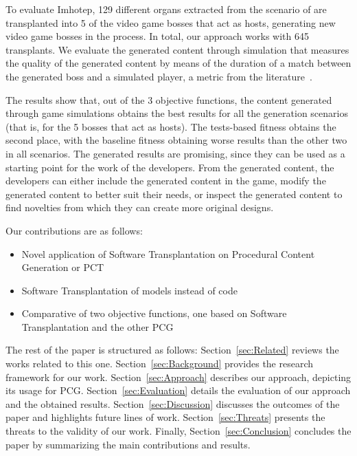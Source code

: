 To evaluate Imhotep, 129 different organs extracted from the scenario of \CaseStudy are transplanted into 5 of the video game bosses that act as hosts, generating new video game bosses in the process. In total, our approach works with 645 transplants. We evaluate the generated content through simulation that measures the quality of the generated content by means of the duration of a match between the generated boss and a simulated player, a metric from the literature~\cite{browne2010evolutionary}. 

The results show that, out of the 3 objective functions, the content generated through game simulations obtains the best results for all the generation scenarios (that is, for the 5 bosses that act as hosts). The tests-based fitness obtains the second place, with the baseline fitness obtaining worse results than the other two in all scenarios. The generated results are promising, since they can be used as a starting point for the work of the developers. From the generated content, the developers can either include the generated content in the game, modify the generated content to better suit their needs, or inspect the generated content to find novelties from which they can create more original designs. 

Our contributions are as follows:
\begin{itemize}
    \item Novel application of Software Transplantation on Procedural Content Generation or PCT
    \item Software Transplantation of models instead of code
    \item Comparative of two objective functions, one based on Software Transplantation and the other PCG 
\end{itemize}

The rest of the paper is structured as follows: Section~\ref{sec:Related} reviews the works related to this one. Section~\ref{sec:Background} provides the research framework for our work. Section~\ref{sec:Approach} describes our approach, depicting its usage for PCG. Section~\ref{sec:Evaluation} details the evaluation of our approach and the obtained results. Section~\ref{sec:Discussion} discusses the outcomes of the paper and highlights future lines of work. Section~\ref{sec:Threats} presents the threats to the validity of our work. Finally, Section~\ref{sec:Conclusion} concludes the paper by summarizing the main contributions and results.